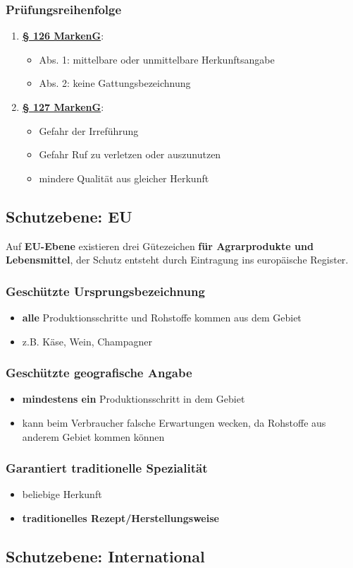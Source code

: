 \documentclass[12pt,A4]{extarticle}
\newcommand{\markenG}[2][]{\textbf{\textcolor{markenGesetzLink}{\href{https://www.gesetze-im-internet.de/markeng/__#2.html}{§ #2 \ifthenelse{\equal{#1}{}}{}{#1 }MarkenG}}}}
\begin{document}
\subsubsection{Prüfungsreihenfolge}
\begin{enumerate}
  \item{\markenG{126}:
              \begin{itemize}
                \item{Abs. 1: mittelbare oder unmittelbare Herkunftsangabe}
                \item{Abs. 2: keine Gattungsbezeichnung}
              \end{itemize}
        }
  \item{\markenG{127}:
              \begin{itemize}
                \item{Gefahr der Irreführung}
                \item{Gefahr Ruf zu verletzen oder auszunutzen}
                \item{mindere Qualität aus gleicher Herkunft}
              \end{itemize}
        }
\end{enumerate}

\subsection{Schutzebene: EU}
Auf \textbf{EU-Ebene} existieren drei Gütezeichen \textbf{für Agrarprodukte und Lebensmittel}, der Schutz entsteht durch Eintragung ins europäische Register.

\subsubsection{Geschützte Ursprungsbezeichnung}
\begin{itemize}
  \item{\textbf{alle} Produktionsschritte und Rohstoffe kommen aus dem Gebiet}
  \item{z.B. Käse, Wein, Champagner}
\end{itemize}

\subsubsection{Geschützte geografische Angabe}
\begin{itemize}
  \item{\textbf{mindestens ein} Produktionsschritt in dem Gebiet}
  \item{kann beim Verbraucher falsche Erwartungen wecken, da Rohstoffe aus anderem Gebiet kommen können}
\end{itemize}

\subsubsection{Garantiert traditionelle Spezialität}
\begin{itemize}
  \item{beliebige Herkunft}
  \item{\textbf{traditionelles Rezept/Herstellungsweise}}
\end{itemize}

\subsection{Schutzebene: International}
\end{document}
